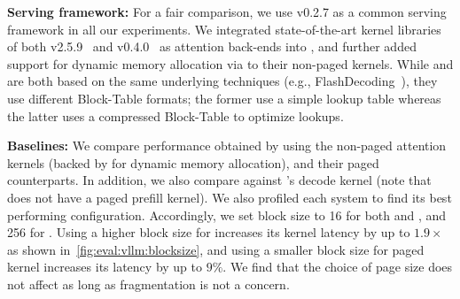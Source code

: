 \noindent
\textbf{Serving framework:} For a fair comparison, we use \vllm v0.2.7 as a common serving framework in all our experiments. We integrated state-of-the-art kernel libraries of both \flashattention v2.5.9~\cite{flashattention,flashattention2,fagithub} and \flashinfer v0.4.0~\cite{figithub} as attention back-ends into \vllm, and further added support for dynamic memory allocation via \sysname to their non-paged kernels. While \flashattention and \flashinfer are both based on the same underlying techniques (e.g., FlashDecoding~\cite{flashdecoding}), they use different Block-Table formats; the former use a simple lookup table whereas the latter uses a compressed Block-Table to optimize lookups.


\noindent
\textbf{Baselines:}  We compare performance obtained by using the non-paged attention kernels (backed by \sysname for dynamic memory allocation), and their paged counterparts. In addition, we also compare against \vllm's decode kernel (note that \vllm does not have a paged prefill kernel). We also profiled each system to find its best performing configuration. Accordingly, we set \kvcache block size to 16 for both \vllm and \flashinfer, and 256 for \flashattention. Using a higher block size for \vllm increases its kernel latency by up to $1.9\times$ as shown in~\autoref{fig:eval:vllm:blocksize}, and using a smaller block size for \flashattention paged kernel increases its latency by up to $9\%$. We find that the choice of page size does not affect \sysname as long as fragmentation is not a concern. 




